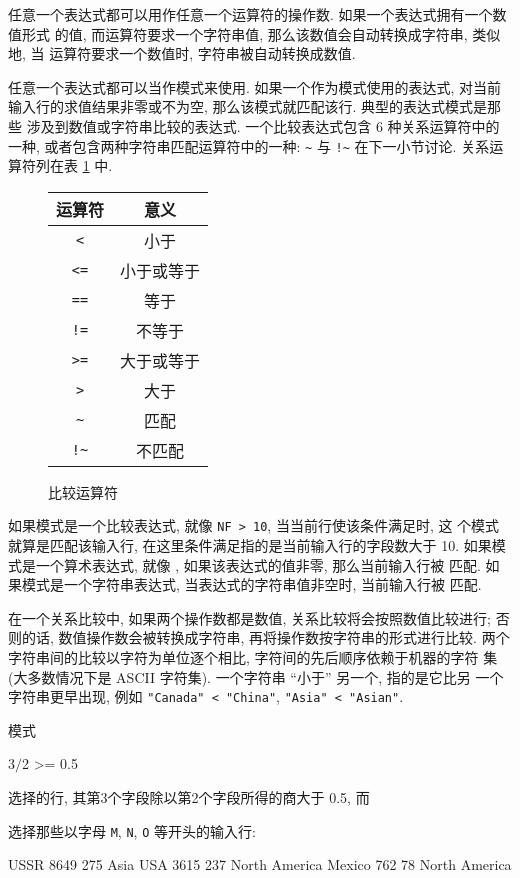 任意一个表达式都可以用作任意一个运算符的操作数.
如果一个表达式拥有一个数值形式%
%
的值, 而运算符要求一个字符串值, 那么该数值会自动转换成字符串, 类似地, 当
运算符要求一个数值时, 字符串被自动转换成数值.

任意一个表达式都可以当作模式来使用. 如果一个作为模式使用的表达式, 对当前
输入行的求值结果非零或不为空, 那么该模式就匹配该行. 典型的表达式模式是那些
涉及到数值或字符串比较的表达式. 一个比较表达式包含 6 种关系运算符中的一种,
或者包含两种字符串匹配运算符中的一种: \verb'~' 与 \verb'!~' 在下一小节讨论.
关系运算符列在表 \ref{tbl:comparison_operators} 中.
\begin{figure}[ht]
\captionsetup{type=table}
\caption{比较运算符}
\label{tbl:comparison_operators}
\begin{center}
\begin{tabular}{c|c}
    \hline
    \hline
    运算符      & 意义 \\
    \hline
    \verb'<'    & 小于 \\
    \verb'<='   & 小于或等于 \\
    \verb'=='   & 等于  \\
    \verb'!='   & 不等于 \\
    \verb'>='   & 大于或等于 \\
    \verb'>'    & 大于  \\
    \verb'~'    & 匹配 \\
    \verb'!~'   & 不匹配 \\
    \hline
\end{tabular}
\end{center}
\end{figure}

如果模式是一个比较表达式, 就像 \verb'NF > 10', 当当前行使该条件满足时, 这
个模式就算是匹配该输入行, 在这里条件满足指的是当前输入行的字段数大于 10.
如果模式是一个算术表达式, 就像 \nf, 如果该表达式的值非零, 那么当前输入行被
匹配. 如果模式是一个字符串表达式, 当表达式的字符串值非空时, 当前输入行被
匹配.

在一个关系比较中, 如果两个操作数都是数值, 关系比较将会按照数值比较进行;
否则的话, 数值操作数会被转换成字符串, 再将操作数按字符串的形式进行比较.
两个字符串间的比较以字符为单位逐个相比,
字符间的先后顺序依赖于机器的字符
集 (大多数情况下是 ASCII 字符集). 一个字符串 ``小于'' 另一个, 指的是它比另
一个字符串更早出现, 例如 \verb'"Canada" < "China"',
\verb'"Asia" < "Asian"'.

模式
\begin{awkcode}
    $3/$2 >= 0.5
\end{awkcode}
选择的行, 其第3个字段除以第2个字段所得的商大于 0.5, 而
选择那些以字母 \verb'M', \verb'N', \verb'O' 等开头的输入行:
\begin{awkcode}
    USSR        8649    275     Asia
    USA         3615    237     North America
    Mexico      762     78      North America
\end{awkcode}

